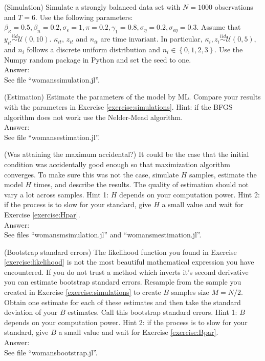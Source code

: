 \begin{exercise} (Simulation) \label{exercise:simulations}
Simulate a strongly balanced data set with $N = 1000$ observations and $T=6$. Use the following parameters: $\beta_\kappa = 0.5, \beta_n = 0.2, \sigma_\epsilon = 1, \pi = 0.2, \gamma_1 = 0.8, \sigma_\eta = 0.2, \sigma_{\epsilon \eta} = 0.3$. Assume that $y_{it} \overset{iid}{\sim} \mathcal{U} (0,10)$. $\kappa_{it}$, $z_{it}$ and $n_{it}$ are time invariant. In particular, $\kappa_{i}, z_{i} \overset{iid}{\sim} \mathcal{U} (0,5)$, and $n_{i}$ follows a discrete uniform distribution and $n_{i} \in \left\{0,1,2,3\right\}$. Use the Numpy random package in Python and set the seed to one. \\
\noindent Answer:\\
\noindent See file ``womanssimulation.jl''.
\end{exercise}

\begin{exercise} (Estimation)
Estimate the parameters of the model by ML. Compare your results with the parameters in Exercise \ref{exercise:simulations}. Hint: if the BFGS algorithm does not work use the Nelder-Mead algorithm.\\
\noindent Answer:\\
\noindent See file ``womansestimation.jl''.
\end{exercise}

\begin{exercise} (Was attaining the maximum accidental?) \label{exercise:accident}
It could be the case that the initial condition was accidentally good enough so that maximization algorithm converges. To make sure this was not the case, simulate $H$ samples, estimate the model $H$ times, and describe the results. The quality of estimation should not vary a lot across samples. Hint 1: $H$ depends on your computation power. Hint 2: if the process is to slow for your standard, give $H$ a small value and wait for Exercise \ref{exercise:Hpar}.\\
\noindent Answer:\\
\noindent See files ``womansmsimulation.jl'' and ``womansmestimation.jl''.
\end{exercise}

\begin{exercise} (Bootstrap standard errors) \label{exercise:bootstrap}
The likelihood function you found in Exercise \ref{exercise:likelihood} is not the most beautiful mathematical expression you have encountered. If you do not trust a method which inverts it's second derivative you can estimate bootstrap standard errors. Resample from the sample you created in Exercise \ref{exercise:simulations} to create $B$ samples size $M = N/2$. Obtain one estimate for each of these estimates and then take the standard deviation of your $B$ estimates. Call this bootstrap standard errors. Hint 1: $B$ depends on your computation power. Hint 2: if the process is to slow for your standard, give $B$ a small value and wait for Exercise \ref{exercise:Bpar}.\\
\noindent Answer: \\
\noindent See file ``womansbootstrap.jl''.
\end{exercise}

